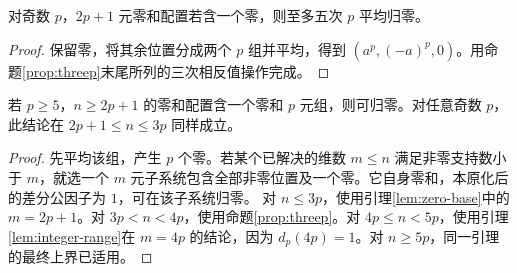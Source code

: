 \begin{lemma}\label{lem:zero-base}
对奇数 $p$，$2p+1$ 元零和配置若含一个零，则至多五次 $p$ 平均归零。
\end{lemma}
\begin{proof}
保留零，将其余位置分成两个 $p$ 组并平均，得到 $(a^p,(-a)^p,0)$。用命题\ref{prop:threep}末尾所列的三次相反值操作完成。
\end{proof}

\begin{lemma}\label{lem:zero-tail}
若 $p\ge5$，$n\ge2p+1$ 的零和配置含一个零和 $p$ 元组，则可归零。对任意奇数 $p$，此结论在 $2p+1\le n\le3p$ 同样成立。
\end{lemma}
\begin{proof}
先平均该组，产生 $p$ 个零。若某个已解决的维数 $m\le n$ 满足非零支持数小于 $m$，就选一个 $m$ 元子系统包含全部非零位置及一个零。它自身零和，本原化后的差分公因子为 $1$，可在该子系统归零。
对 $n\le3p$，使用引理\ref{lem:zero-base}中的 $m=2p+1$。对 $3p<n<4p$，使用命题\ref{prop:threep}。对 $4p\le n<5p$，使用引理\ref{lem:integer-range}在 $m=4p$ 的结论，因为 $d_p(4p)=1$。对 $n\ge5p$，同一引理的最终上界已适用。
\end{proof}


